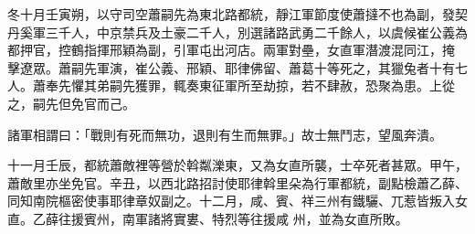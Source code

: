 \begin{pinyinscope}
 冬十月壬寅朔，以守司空蕭嗣先為東北路都統，靜江軍節度使蕭撻不也為副，發契丹奚軍三千人，中京禁兵及土豪二千人，別選諸路武勇二千餘人，以虞候崔公義為都押官，控鶴指揮邢穎為副，引軍屯出河店。兩軍對壘，女直軍潛渡混同江，掩
 擊遼眾。蕭嗣先軍演，崔公義、邢穎、耶律佛留、蕭葛十等死之，其獵兔者十有七人。蕭奉先懼其弟嗣先獲罪，輒奏東征軍所至劫掠，若不肆赦，恐聚為患。上從之，嗣先但免官而己。



 諸軍相謂曰：「戰則有死而無功，退則有生而無罪。」故士無鬥志，望風奔潰。



 十一月壬辰，都統蕭敵裡等營於斡粼濼東，又為女直所襲，士卒死者甚眾。甲午，蕭敵里亦坐免官。辛丑，以西北路招討使耶律斡里朵為行軍都統，副點檢蕭乙薛、同知南院樞密使事耶律章奴副之。十二月，咸、賓、祥三州有鐵驪、兀惹皆叛入女直。乙薛往援賓州，南軍諸將實婁、特烈等往援咸
 州，並為女直所敗。



\end{pinyinscope}